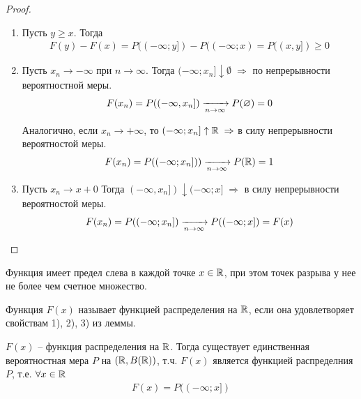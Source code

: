 \begin{proof}~

	\begin{enumerate}
		\item 
			Пусть $y \geq x$. Тогда
			\begin{align*}
				F(y) - F(x) = P((-\infty; y]) - P((-\infty; x) = P((x, y]) \geq 0
			\end{align*}

		\item 
			Пусть $x_n \rightarrow -\infty$ при $n \rightarrow \infty$. 
			Тогда $(-\infty; x_n] \downarrow \emptyset\; \Rightarrow$ по непрерывности вероятностной меры.
			\begin{align*}
				F(x_n) = P((-\infty, x_n]) \xrightarrow[n \to \infty]{} P(\varnothing) = 0
			\end{align*}

			Аналогично, если $x_n \to +\infty$, то $(-\infty; x_n] \uparrow \mathbb{R}\; \Rightarrow$ 
			в силу непрерывности вероятностой меры.
			\begin{align*}
				F(x_n) = P((-\infty; x_n])) \xrightarrow[n \to \infty]{} P(\mathbb{R}) = 1
			\end{align*}

		\item 
			Пусть $x_n \to x + 0$ Тогда $(-\infty, x_n]) \downarrow (-\infty; x]\; \Rightarrow$ 
			в силу непрерывности вероятностой меры.
			\begin{align*}
				F(x_n) = P((-\infty; x_n]) \xrightarrow[n \to \infty]{} P((-\infty; x]) = F(x)
			\end{align*}
	\end{enumerate}
\end{proof}

\begin{corollary}
	Функция имеет предел слева в каждой точке $x \in \mathbb{R}$, при этом точек разрыва у нее не более чем счетное множество.
\end{corollary}

\begin{definition}
	Функция $F(x)$ называет функцией распределения на $\mathbb{R}$, если она удовлетворяет свойствам 
	1), 2), 3) из леммы.
\end{definition}

\begin{theorem}
	$F(x)$ -- функция распределения на $\mathbb{R}$. 
	Тогда существует единственная вероятностная мера $P$ на $(\mathbb{R}, B(\mathbb{R}))$, т.ч. $F(x)$ 
	является функцией распределния $P$, т.е. $\forall x \in \mathbb{R}$
	\begin{align*}
		F(x) = P((-\infty; x])
	\end{align*}
\end{theorem}

